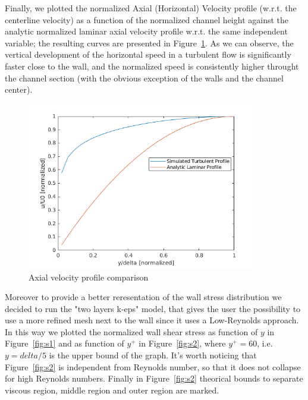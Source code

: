 \documentclass[12pt]{article}
\begin{document}
        Finally, we plotted the normalized Axial (Horizontal) Velocity profile (w.r.t. the centerline velocity) as a function of the normalized channel height against the analytic normalized laminar axial velocity profile w.r.t. the same independent variable; the resulting curves are presented in Figure~\ref{fig:axialV}. As we can observe, the vertical development of the horizontal speed in a turbulent flow is significantly faster close to the wall, and the normalized speed is consistently higher throught the channel section (with the obvious exception of the walls and the channel center).

        \begin{figure}
                \centering
                \includegraphics[width=0.9\textwidth]{Axial_Velocities.png}
                \caption{Axial velocity profile comparison}
                \label{fig:axialV}
        \end{figure}
        
        Moreover to provide a better reresentation of the wall stress distribution we decided to run the "two layers k-eps" model, that gives the user the possibility to use a more refined mesh next to the wall since it uses a Low-Reynolds approach. In this way we plotted the normalized wall shear stress as function of \(y\) in Figure~\ref{fig:s1} and as function of \( y^+ \) in Figure~\ref{fig:s2}, where \( y^+ =60 \), i.e.\( y =delta/5 \) is the upper bound of the graph. It's worth noticing that Figure~\ref{fig:s2} is independent from Reynolds number, so that it does not collapse for high Reynolds numbers. Finally in Figure~\ref{fig:s2} theorical bounds to separate viscous region, middle region and outer region are marked.
\end{document}
